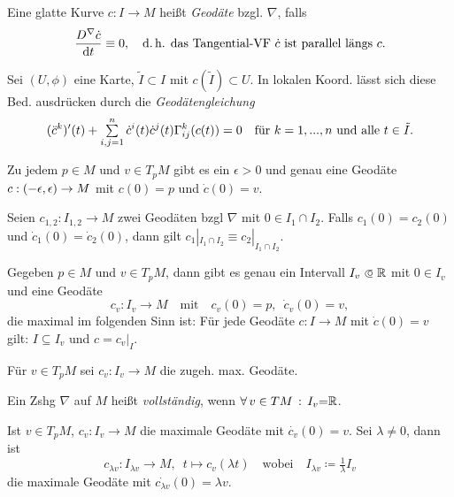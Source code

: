 \documentclass{cheat-sheet}
\newcommand{\vinterval}{\ointerval{-\epsilon}{\epsilon}} %
\begin{document}

\begin{defn}
  Eine glatte Kurve $c : I \to M$ heißt \emph{Geodäte} bzgl. $\nabla$, falls
  \[
    \frac{D^\nabla \dot{c}}{\mathrm{d} t} \equiv 0, \quad
    \text{d.\,h.{} das Tangential-VF $\dot{c}$ ist parallel längs $c$.}
  \]
\end{defn}

\begin{bem}
  Sei $(U, \phi)$ eine Karte, $\tilde{I} \subset I$ mit $c(\tilde{I}) \subset U$.
  In lokalen Koord. lässt sich diese Bed. ausdrücken durch die \emph{Geodätengleichung}
  \[
    (\ddot{c}^{k})'(t) + \sum_{i,j=1}^n \dot{c}^i(t) \dot{c}^j(t) \Gamma_{ij}^k(c(t)) = 0
    \quad \text{für $k = 1, \nldots, n$ und alle $t \in \tilde{I}$.}
  \]
\end{bem}

\begin{satz}
  Zu jedem $p \in M$ und $v \in T_p M$ gibt es ein $\epsilon > 0$ und genau eine Geodäte $c : \vinterval \to M$ mit $c(0) = p$ und $\dot{c}(0) = v$.
\end{satz}

\begin{satz}
  Seien $c_{1,2} : I_{1,2} \to M$ zwei Geodäten bzgl $\nabla$ mit $0 \in I_1 \cap I_2$. Falls $c_1(0) = c_2(0)$ und $\dot{c}_1(0) = \dot{c}_2(0)$, dann gilt $c_1|_{I_1 \cap I_2} \equiv c_2|_{I_1 \cap I_2}$.
\end{satz}

\begin{satz}
  Gegeben $p \in M$ und $v \in T_p M$, dann gibt es genau ein Intervall $I_v \opn \R$ mit $0 \in I_v$ und eine Geodäte
  \[
    c_v : I_v \to M
    \quad \text{mit} \quad
    c_v(0) = p, \enspace \dot{c}_v(0) = v,
  \]
  die maximal im folgenden Sinn ist: Für jede Geodäte $c : I \to M$ mit $\dot{c}(0) = v$ gilt: $I \subseteq I_v$ und $c = c_v|_I$.
\end{satz}

\begin{nota}
  Für $v \in T_p M$ sei $c_v : I_v \to M$ die zugeh. max. Geodäte.
\end{nota}

\begin{defn}
  Ein Zshg $\nabla$ auf $M$ heißt \emph{vollständig}, wenn $\forall \, {v \in TM} \,:\, I_v {=} \mathbb{R}$.
\end{defn}


\begin{lem}
  Ist $v \in T_p M$, $c_v : I_v \to M$ die maximale Geodäte mit $\dot{c_v}(0) = v$.
  Sei $\lambda \not= 0$, dann ist
  \[
    c_{\lambda v} : I_{\lambda v} \to M, \enspace
    t \mapsto c_v(\lambda t) \quad \text{wobei} \quad
    I_{\lambda v} \coloneqq \tfrac{1}{\lambda} I_v
  \]
  die maximale Geodäte mit $\dot{c_{\lambda v}}(0) = \lambda v$.
\end{lem}
\end{document}
